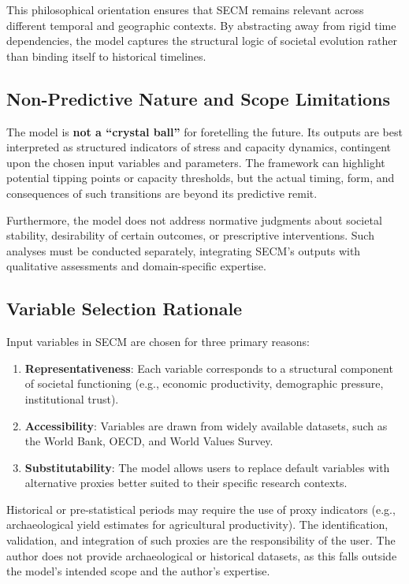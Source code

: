 \documentclass[12pt,a4paper]{article}
\begin{document}
This philosophical orientation ensures that SECM remains relevant across different temporal and geographic contexts. By abstracting away from rigid time dependencies, the model captures the structural logic of societal evolution rather than binding itself to historical timelines.

\subsection{Non-Predictive Nature and Scope Limitations}
The model is \textbf{not a “crystal ball”} for foretelling the future. Its outputs are best interpreted as structured indicators of stress and capacity dynamics, contingent upon the chosen input variables and parameters. The framework can highlight potential tipping points or capacity thresholds, but the actual timing, form, and consequences of such transitions are beyond its predictive remit.

Furthermore, the model does not address normative judgments about societal stability, desirability of certain outcomes, or prescriptive interventions. Such analyses must be conducted separately, integrating SECM’s outputs with qualitative assessments and domain-specific expertise.

\subsection{Variable Selection Rationale}
Input variables in SECM are chosen for three primary reasons:
\begin{enumerate}
    \item \textbf{Representativeness}: Each variable corresponds to a structural component of societal functioning (e.g., economic productivity, demographic pressure, institutional trust).
    \item \textbf{Accessibility}: Variables are drawn from widely available datasets, such as the World Bank, OECD, and World Values Survey.
    \item \textbf{Substitutability}: The model allows users to replace default variables with alternative proxies better suited to their specific research contexts.
\end{enumerate}

Historical or pre-statistical periods may require the use of proxy indicators (e.g., archaeological yield estimates for agricultural productivity). The identification, validation, and integration of such proxies are the responsibility of the user. The author does not provide archaeological or historical datasets, as this falls outside the model’s intended scope and the author’s expertise.
\end{document}
